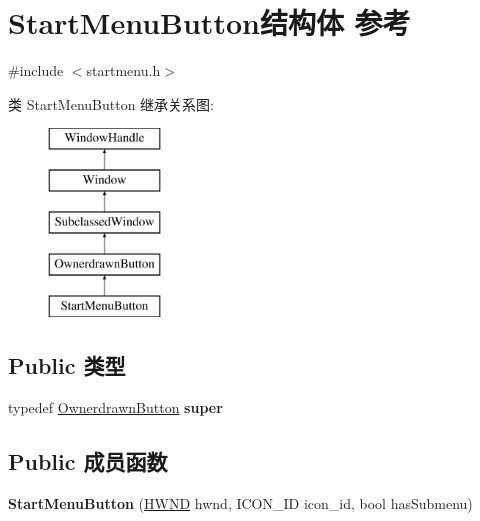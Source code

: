 \hypertarget{struct_start_menu_button}{}\section{Start\+Menu\+Button结构体 参考}
\label{struct_start_menu_button}


{\ttfamily \#include $<$startmenu.\+h$>$}

类 Start\+Menu\+Button 继承关系图\+:\begin{figure}[H]
\begin{center}
\leavevmode
\includegraphics[height=5.000000cm]{struct_start_menu_button}
\end{center}
\end{figure}
\subsection*{Public 类型}
\begin{DoxyCompactItemize}
\item 
\mbox{\label{struct_start_menu_button_a2367cfe1f28f08145bdbf587810661d7}} 
typedef \hyperlink{struct_ownerdrawn_button}{Ownerdrawn\+Button} {\bfseries super}
\end{DoxyCompactItemize}
\subsection*{Public 成员函数}
\begin{DoxyCompactItemize}
\item 
\mbox{\label{struct_start_menu_button_a1fc46fc023bf3b79b67261e26fa22bcb}} 
{\bfseries Start\+Menu\+Button} (\hyperlink{interfacevoid}{H\+W\+ND} hwnd, I\+C\+O\+N\+\_\+\+ID icon\+\_\+id, bool has\+Submenu)
\end{DoxyCompactItemize}
